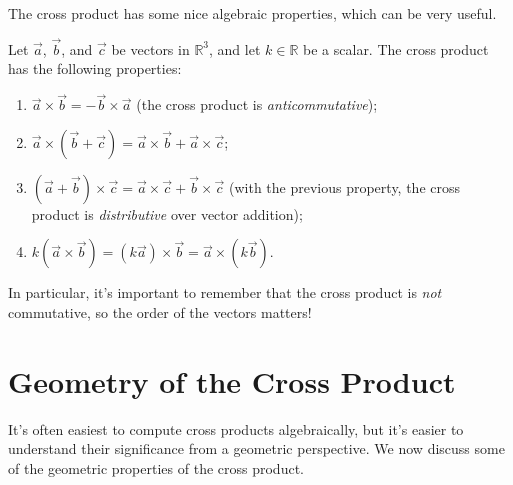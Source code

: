 \documentclass{ximera}
\begin{document}
The cross product has some nice algebraic properties, which can be very useful.

\begin{proposition}
Let $\vec{a}$, $\vec{b}$, and $\vec{c}$ be vectors in $\mathbb{R}^3$, and let $k\in\mathbb{R}$ be a scalar. The cross product has the following properties:
\begin{enumerate}
\item $\vec{a}\times \vec{b} = -\vec{b}\times \vec{a}$ (the cross product is \emph{anticommutative});
\item $\vec{a}\times(\vec{b}+\vec{c}) = \vec{a}\times\vec{b}+\vec{a}\times\vec{c}$;
\item $(\vec{a}+\vec{b})\times\vec{c} = \vec{a}\times\vec{c}+\vec{b}\times\vec{c}$ (with the previous property, the cross product is \emph{distributive} over vector addition);
\item $k(\vec{a}\times\vec{b})=(k\vec{a})\times\vec{b} = \vec{a}\times(k\vec{b})$.
\end{enumerate}
\end{proposition}

In particular, it's important to remember that the cross product is \emph{not} commutative, so the order of the vectors matters!

\section{Geometry of the Cross Product}

It's often easiest to compute cross products algebraically, but it's easier to understand their significance from a geometric perspective. We now discuss some of the geometric properties of the cross product.
\end{document}
